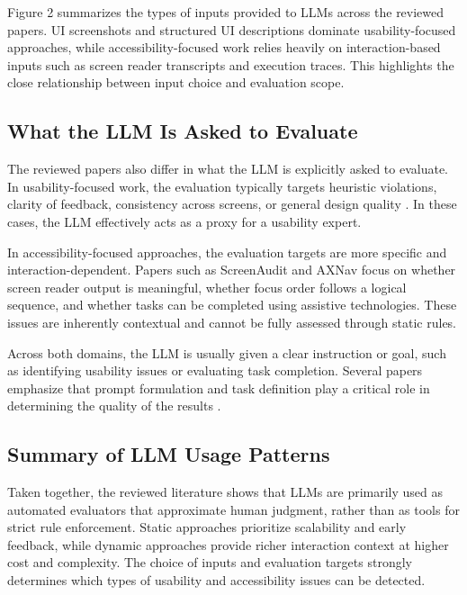 \documentclass[acmsmall,nonacm]{acmart}
\begin{document}
Figure 2 summarizes the types of inputs provided to LLMs across the reviewed papers. UI screenshots and structured UI descriptions dominate usability-focused approaches, while accessibility-focused work relies heavily on interaction-based inputs such as screen reader transcripts and execution traces. This highlights the close relationship between input choice and evaluation scope.

\subsection{What the LLM Is Asked to Evaluate}

The reviewed papers also differ in what the LLM is explicitly asked to evaluate. In usability-focused work, the evaluation typically targets heuristic violations, clarity of feedback, consistency across screens, or general design quality \cite{zhong2023synthetic_heuristic,wang2024aiheureval,yang2023uisgpt}. In these cases, the LLM effectively acts as a proxy for a usability expert.

In accessibility-focused approaches, the evaluation targets are more specific and interaction-dependent. Papers such as ScreenAudit \cite{zhong2024screenaudit} and AXNav \cite{taeb2023axnav} focus on whether screen reader output is meaningful, whether focus order follows a logical sequence, and whether tasks can be completed using assistive technologies. These issues are inherently contextual and cannot be fully assessed through static rules.

Across both domains, the LLM is usually given a clear instruction or goal, such as identifying usability issues or evaluating task completion. Several papers emphasize that prompt formulation and task definition play a critical role in determining the quality of the results \cite{hsueh2023llm_ux_testing,zhong2023synthetic_heuristic,wang2024aiheureval}.

\subsection{Summary of LLM Usage Patterns}

Taken together, the reviewed literature shows that LLMs are primarily used as automated evaluators that approximate human judgment, rather than as tools for strict rule enforcement. Static approaches prioritize scalability and early feedback, while dynamic approaches provide richer interaction context at higher cost and complexity. The choice of inputs and evaluation targets strongly determines which types of usability and accessibility issues can be detected.
\end{document}
